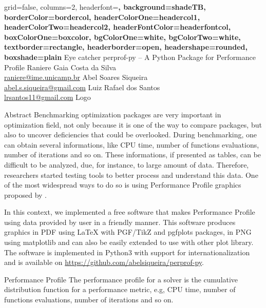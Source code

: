 \documentclass[a0paper,portrait]{baposter}
\begin{document}
\begin{poster}
  {
    grid=false,
    columns=2,
    headerfont=\Large\sf\bf,
    background=shadeTB,
    borderColor=bordercol,
    headerColorOne=headercol1,
    headerColorTwo=headercol2,
    headerFontColor=headerfontcol,
    boxColorOne=boxcolor,
    bgColorOne=white,
    bgColorTwo=white,
    textborder=rectangle,
    headerborder=open,
    headershape=rounded,
    boxshade=plain
  }
  {
    Eye catcher
  }
  {
    perprof-py -- A Python Package for Performance Profile
  }
  {
    Raniere Gaia Costa da Silva \\
    \url{raniere@ime.unicamp.br}
    Abel Soares Siqueira \\
    \url{abel.s.siqueira@gmail.com}
    Luiz Rafael dos Santos \\
    \url{lrsantos11@gmail.com}
  }
  {
    Logo
  }

  \begin{posterbox}[column=0]{Abstract}
    Benchmarking optimization packages are very important in optimization
    field, not only because it is one of the way to compare packages, but also
    to uncover deficiencies that could be overlooked. During benchmarking, one
    can obtain several informations, like CPU time, number of functions
    evaluations, number of iterations and so on. These informations, if
    presented as tables, can be difficult to be analyzed, due, for instance,
    to large amount of data. Therefore, researchers started testing tools to
    better process and understand this data.  One of the most widespread ways
    to do so is using Performance Profile graphics proposed by
    \cite{Dolan2001}.

    In this context, we implemented a free software that makes Performance
    Profile using data provided by user in a friendly manner. This software
    produces graphics in PDF using LaTeX with PGF/TikZ\nocite{TikZ} and
    pgfplots\nocite{pgfplots} packages, in PNG using
    matplotlib\nocite{Hunter:2007} and can also be easily extended to use with
    other plot library. The software is implemented in Python3 with support
    for internationalization and is available on
    \url{https://github.com/abelsiqueira/perprof-py}.
  \end{posterbox}

  \begin{posterbox}[column=0,below=auto]{Performance Profile}
    The performance profile for a solver is the cumulative distribution
    function for a performance metric, e.g, CPU time, number of functions
    evaluations, number of iterations and so on.


\end{posterbox}
\end{poster}
\end{document}
